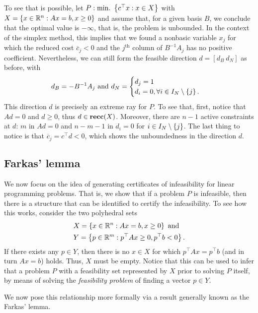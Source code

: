 To see that is possible, let $P : \mathop{\text{min.~}}\left\{ c^\top x : x \in X \right \}$ with $X = \left\{ x \in \mathbb{R}^n : Ax = b, x \geq 0 \right \}$ and assume that, for a given basis $B$, we conclude that the optimal value is $-\infty$, that is, the problem is unbounded. In the context of the simplex method, this implies that we found a nonbasic variable $x_j$ for which the reduced cost $\overline{c}_j < 0$ and the $j^\text{th}$ column of $B^{-1}A_j$ has no positive coefficient. Nevertheless, we can still form the feasible direction $d= [d_B ~ d_N]$ as before, with
%
\begin{equation*}
	d_B = -B^{-1}A_j \text{ and } 
	d_N = \begin{cases}
 		d_j = 1 \\
 		d_i = 0, \forall i \in I_N \setminus \left\{ j \right \}.
 	\end{cases}
\end{equation*}
%
This direction $d$ is precisely an extreme ray for $P$. To see that, first, notice that $Ad = 0$ and $d \geq 0$, thus	$d \in {\bf recc}(X)$. Moreover, there are $n-1$ active constraints at $d$: $m$ in $Ad = 0$ and $n-m-1$ in $d_i = 0$ for $i \in I_N \setminus \left\{ j \right \}$. The last thing to notice is that $\overline{c}_j = c^\top d < 0$, which shows the unboundedness in the direction $d$. 

 

\subsection{Farkas' lemma}

We now focus on the idea of generating certificates of infeasibility for linear programming problems. That is, we show that if a problem $P$ is infeasible, then there is a structure that can be identified to certify the infeasibility. To see how this works, consider the two polyhedral sets
%
\begin{align*}
	&X = \left\{ x \in \mathbb{R}^n : Ax = b,  x \geq 0 \right \} \text{ and } \\ 
	&Y = \left\{ p \in \mathbb{R}^m : p^\top A x \geq 0, p^\top b < 0 \right \}.
\end{align*}
%
If there exists any $p \in Y$, then there is no $x \in X$ for which $p^\top Ax = p^\top b$ (and in turn $Ax = b$) holds. Thus, $X$ must be empty. Notice that this can be used to infer that a problem $P$ with a feasibility set represented by $X$ prior to solving $P$ itself, by means of solving the \emph{feasibility problem} of finding a vector $p \in Y$. 

We now pose this relationship more formally via a result generally known as the Farkas' lemma.

